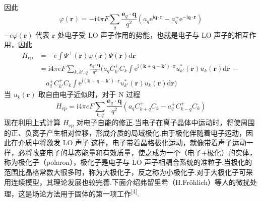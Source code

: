 因此
\begin{equation}
  \varphi\left(\boldsymbol{r}\right)=-\mathrm{i}4\pi F\sum_{q}\frac{\boldsymbol{e}_q\cdot\boldsymbol{q}}{q^2}
  \left(a_q\mathrm{e}^{\mathrm{i}\boldsymbol{q}\cdot\boldsymbol{r}}-a_q^{+}\mathrm{e}^{-\mathrm{i}\boldsymbol{q}\cdot\boldsymbol{r}}\right)
\end{equation}
$-e\varphi\left(\boldsymbol{r}\right)$ 代表 $\boldsymbol{r}$ 处电子受 LO 声子作用的势能，也就是电子与 LO 声子的相互作用，因此
\begin{equation}
\begin{aligned}
  H_{\mathrm{ep}}&=-e\int\varPsi^{+}\left(\boldsymbol{r}\right)\varphi\left(\boldsymbol{r}\right)\varPsi\left(\boldsymbol{r}\right)\mathrm{d}\boldsymbol{r}\\
  &=\mathrm{i}4\pi eF\sum_{k,k',q}\frac{\boldsymbol{e}_q\cdot\boldsymbol{q}}{q^2}
  \bigg(a_qC_{k'}^{+}C_k\int\mathrm{e}^{\mathrm{i}\left(\boldsymbol{k}+\boldsymbol{q}-\boldsymbol{k}'\right)\cdot\boldsymbol{r}}
  u_{k'}^{*}\left(\boldsymbol{r}\right)u_k\left(\boldsymbol{r}\right)\mathrm{d}\boldsymbol{r}\,-\\
  &\quad a_q^{+}C_{k'}^{+}C_k\int\mathrm{e}^{\mathrm{i}\left(\boldsymbol{k}-\boldsymbol{q}-\boldsymbol{k}'\right)\cdot\boldsymbol{r}}
  u_{k'}^{*}\left(\boldsymbol{r}\right)u_k\left(\boldsymbol{r}\right)\mathrm{d}\boldsymbol{r}\bigg)
\end{aligned}
\end{equation}
当 $u_k\left(\boldsymbol{r}\right)$ 取自由电子近似时，对于 N 过程
\begin{equation}
  H_{\mathrm{ep}}=\mathrm{i}4\pi eF\sum_{k,q}\frac{\boldsymbol{e}_q\cdot\boldsymbol{q}}{q^2}
  \left(a_qC_{k+q}^{+}C_k-a_q^{+}C_{k-q}^{+}C_k\right)
\end{equation}
现在利用上式计算 $H_{\mathrm{ep}}$ 对电子自能的修正.当电子在离子晶体中运动时，将使周围的正、负离子产生相对位移，形成介质的局域极化.由于极化伴随着电子运动，因此在介质中将激发 LO 声子.这样，电子带着晶格极化运动，就像带着声子运动一样，必将改变电子的基态能量和有效质量，使之成为一个（电子+极化）的实体，称为极化子（polaron），极化子是电子与 LO 声子相耦合系统的准粒子.当极化的范围比晶格常数大很多时，称为大极化子，反之称为小极化子.对于大极化子可采用连续模型，其理论发展也较完善.下面介绍弗留里希（H.Fr\"{o}hlich）等人的微扰处理，这是场论方法用于固体的第一项工作\textsuperscript{[4]}.

